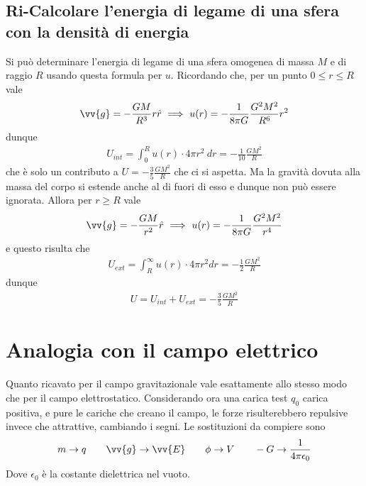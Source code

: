 \documentclass[a4paper, oneside]{book}
\begin{document}
\subsection{Ri-Calcolare l'energia di legame di una sfera con la densità di energia} 
Si può determinare l'energia di legame di una sfera omogenea di massa $M$ e di raggio 
$R$ usando questa formula per $u$. Ricordando che, per un punto $0 \leq r \leq R$ vale
\begin{gather*}
    \vv{g} = - \frac{GM}{R^{3}} r \hat{r} \ \Longrightarrow \ u(r) = -\frac{1}{8\pi G} \frac{G^{2}M^{2}}{R^{6}}r^{2}  
\end{gather*}
dunque
\begin{gather*}
    U_{int} = \int_{0}^{R} u(r) \cdot 4\pi r^{2} \ dr = -\frac{1}{10}\frac{GM^{2}}{R} 
\end{gather*}
che è solo un contributo a $U = -\frac{3}{5}\frac{GM^{2}}{R}$ che ci si aspetta. Ma la gravità 
dovuta alla massa del corpo si estende anche al di fuori di esso e dunque non può essere ignorata. Allora 
per $r \geq R$ vale
\begin{gather*}
    \vv{g} = - \frac{GM}{r^{2}} \hat{r} \ \Longrightarrow \ u(r) = - \frac{1}{8\pi G} \frac{G^{2}M^{2}}{r^{4}}  
\end{gather*}
e questo risulta che
\begin{gather*}
    U_{ext} = \int_{R}^{\infty } u(r) \cdot 4\pi r^{2} dr = -\frac{1}{2}\frac{GM^{2}}{R}
\end{gather*}
dunque 
\begin{align}
    U = U_{int} + U_{ext} = -\frac{3}{5}\frac{GM^{2}}{R}
\end{align}


\section{Analogia con il campo elettrico}
Quanto ricavato per il campo gravitazionale vale esattamente allo stesso 
modo che per il campo elettrostatico. Considerando ora una carica test $q_0$ carica 
positiva, e pure le cariche che creano il campo, le forze risulterebbero 
repulsive invece che attrattive, cambiando i segni. Le sostituzioni da compiere
sono 
\begin{gather*}
    m \to q \qquad \vv{g} \to \vv{E} \qquad \phi \to V \qquad -G \to \frac{1}{4\pi\epsilon_0}  
\end{gather*}
Dove $\epsilon_0$ è la costante dielettrica nel vuoto.
\end{document}
